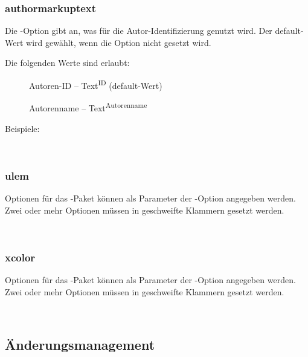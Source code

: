 \subsubsection{authormarkuptext}

Die -Option gibt an, was für die Autor-Identifizierung genutzt wird.
Der default-Wert wird gewählt, wenn die Option nicht gesetzt wird.

Die folgenden Werte sind erlaubt:
\begin{description}
	\item [] Autoren-ID -- Text\textsuperscript{ID} (default-Wert)
	\item [] Autorenname -- Text\textsuperscript{Autorenname}
\end{description}

Beispiele:

\\

\subsubsection{ulem}

Optionen für das -Paket können als Parameter der -Option angegeben werden.
Zwei oder mehr Optionen müssen in geschweifte Klammern gesetzt werden.

\\

\subsubsection{xcolor}

Optionen für das -Paket können als Parameter der -Option angegeben werden.
Zwei oder mehr Optionen müssen in geschweifte Klammern gesetzt werden.

\\


\subsection{Änderungsmanagement}
\label{sec:user:changemanagement}

